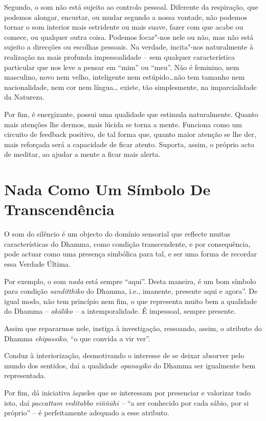 Segundo, o som não está sujeito ao controlo pessoal. Diferente da
respiração, que podemos alongar, encurtar, ou mudar segundo a nossa
vontade, não podemos tornar o som interior mais estridente ou mais
suave, fazer com que acabe ou comece, ou qualquer outra coisa. Podemos
focar"-nos nele ou não, mas não está sujeito a direcções ou escolhas
pessoais. Na verdade, incita"-nos naturalmente à realização na mais
profunda impessoalidade -- sem qualquer característica particular que
nos leve a pensar em ``mim'' ou ``meu''. Não é feminino, nem masculino,
novo nem velho, inteligente nem estúpido\ldots{}não tem tamanho nem
nacionalidade, nem cor nem língua\ldots{} existe, tão simplesmente, na
imparcialidade da Natureza.

Por fim, é energizante, possui uma qualidade que estimula naturalmente.
Quanto mais atenções lhe dermos, mais lúcida se torna a mente. Funciona
como um circuito de feedback positivo, de tal forma que, quanto maior
atenção se lhe der, mais reforçada será a capacidade de ficar atento.
Suporta, assim, o próprio acto de meditar, ao ajudar a mente a ficar
mais alerta.

\section{Nada Como Um Símbolo De Transcendência}

O som do silêncio é um objecto do domínio sensorial que reflecte muitas
características do Dhamma, como condição transcendente, e por
consequência, pode actuar como uma presença simbólica para tal, e ser
uma forma de recordar essa Verdade Última.

Por exemplo, o som \emph{nada} está sempre ``aqui''. Desta maneira, é um
bom símbolo para condição \emph{sanditthiko} do Dhamma, i.e., imanente,
presente aqui e agora''. De igual modo, não tem princípio nem fim, o que
representa muito bem a qualidade do Dhamma -- \emph{akāliko --} a
intemporalidade. É impessoal, sempre presente.

Assim que repararmos nele, instiga à investigação, ressoando, assim, o
atributo do Dhamma \emph{ehipassiko}, ``o que convida a vir ver''.

Conduz à interiorização, desmotivando o interesse de se deixar absorver
pelo mundo dos sentidos, daí a qualidade \emph{opanayiko} do Dhamma ser
igualmente bem representada.

Por fim, dá iniciativa àqueles que se interessam por presenciar e
valorizar tudo isto, daí \emph{paccattam veditabbo viññūhī --} ``a ser
conhecido por cada sábio, por si próprio'' -- é perfeitamente adequado a
esse atributo.


